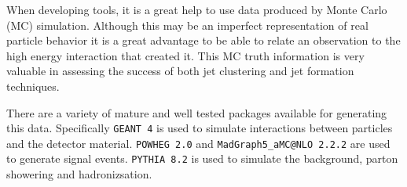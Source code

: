 When developing tools, it is a great help to use data produced by Monte Carlo (MC) simulation.
Although this may be an imperfect representation of real particle behavior 
it is a great advantage to be able to relate an observation to the high energy interaction that created it.
This MC truth information is very valuable in assessing the success of both jet clustering and 
jet formation techniques.

There are a variety of mature and well tested packages available for generating this data.
Specifically \lstinline{GEANT 4} \cite{agostinelli_geant4simulation2003} is used to simulate interactions between particles and the detector material.
\lstinline{POWHEG 2.0} \cite{alioli_powheg2010} and \lstinline{MadGraph5_aMC@NLO 2.2.2} \cite{alwall_madgraph2011} are used to generate signal events.
\lstinline{PYTHIA 8.2} \cite{sjostrand_pythia2015} is used to simulate the background, parton showering and hadronizsation.

